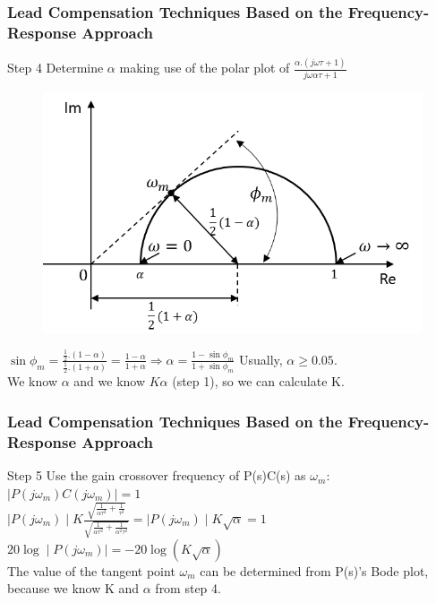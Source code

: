 \begin{frame}	
	\frametitle{Lead Compensation Techniques Based on the Frequency-Response Approach}
	\begin{block}{Step 4}
		Determine $\alpha$ making use of the polar plot of 
		$\frac{\alpha.(j\omega\tau + 1)}{j\omega\alpha\tau + 1}$	
		\begin{figure}
			\centering
			\includegraphics[width=0.4
			\linewidth]{leadcompalphabepalen}
		\end{figure}
		$\sin\phi_m = \frac{\frac{1}{2}.(1 - \alpha)}{\frac{1}{2}.(1 + \alpha)} = \frac{1 - \alpha}{1 + \alpha} \Rightarrow \alpha = \frac{1 - \sin\phi_m}{1 + \sin\phi_m}$ Usually, $\alpha \geqslant 0.05$. \\
		We know $\alpha$ and we know $K\alpha$ (step 1), so we can calculate K.
	\end{block}
\end{frame}

\begin{frame}
	\frametitle{Lead Compensation Techniques Based on the Frequency-Response Approach}
	\begin{block}{Step 5}
		Use the gain crossover frequency of P(s)C(s) as $\omega_m$: \\
		$\mid P(j\omega_m)C(j\omega_m) \mid = 1$ \\
		$\mid P(j\omega_m) \mid K \frac{\sqrt{\frac{1}{\alpha\tau^2} + \frac{1}{\tau^2}}}{\sqrt{\frac{1}{\alpha\tau^2} + \frac{1}{\alpha^2\tau^2}}} = \mid P(j\omega_m) \mid K \sqrt{\alpha} = 1$ \\
		$20\log \mid P(j\omega_m) \mid = -20\log (K\sqrt{\alpha})$ \\
		The value of the tangent point $\omega_m$ can be determined from P(s)'s Bode plot, because we know K and $\alpha$ from step 4.
	\end{block}
\end{frame}

